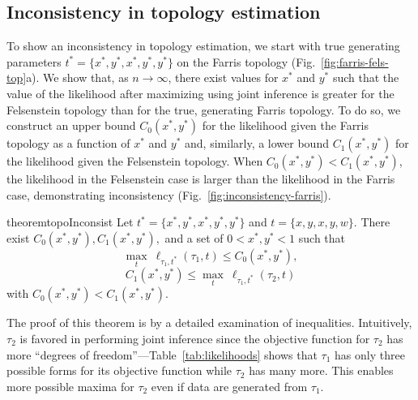 \documentclass{article}
\newcommand{\nCols}{n}
\begin{document}
\subsection*{Inconsistency in topology estimation}

To show an inconsistency in topology estimation, we start with true generating parameters $t^*=\{x^*, y^*, x^*, y^*, y^*\}$ on the Farris topology (Fig.~\ref{fig:farris-fels-top}a).
We show that, as $\nCols\rightarrow\infty$, there exist values for $x^*$ and $y^*$ such that the value of the likelihood after maximizing using joint inference is greater for the Felsenstein topology than for the true, generating Farris topology.
To do so, we construct an upper bound $C_0(x^*, y^*)$ for the likelihood given the Farris topology as a function of $x^*$ and $y^*$ and, similarly, a lower bound $C_1(x^*, y^*)$ for the likelihood given the Felsenstein topology.
When $C_0(x^*, y^*) < C_1(x^*, y^*)$, the likelihood in the Felsenstein case is larger than the likelihood in the Farris case, demonstrating inconsistency (Fig.~\ref{fig:inconsistency-farris}).
\begin{restatable}{theorem}{topoInconsist}
Let $t^*=\{x^*, y^*, x^*, y^*, y^*\}$ and $t=\{x, y, x, y, w\}$.
There exist $C_0(x^*, y^*), C_1(x^*, y^*),$ and a set of $0 < x^*, y^* < 1$ such that
$$
\max_{t} \ \ell_{\tau_1,t^*}(\tau_1, t) \le C_0(x^*, y^*),
$$
$$
C_1(x^*, y^*) \le \max_{t} \ \ell_{\tau_1,t^*}(\tau_2, t)
$$
with $C_0(x^*, y^*) < C_1(x^*, y^*)$.
\end{restatable}
The proof of this theorem is by a detailed examination of inequalities.
Intuitively, $\tau_2$ is favored in performing joint inference since the objective function for $\tau_2$ has more ``degrees of freedom''---Table~\ref{tab:likelihoods} shows that $\tau_1$ has only three possible forms for its objective function while $\tau_2$ has many more.
This enables more possible maxima for $\tau_2$ even if data are generated from $\tau_1$.
\end{document}
